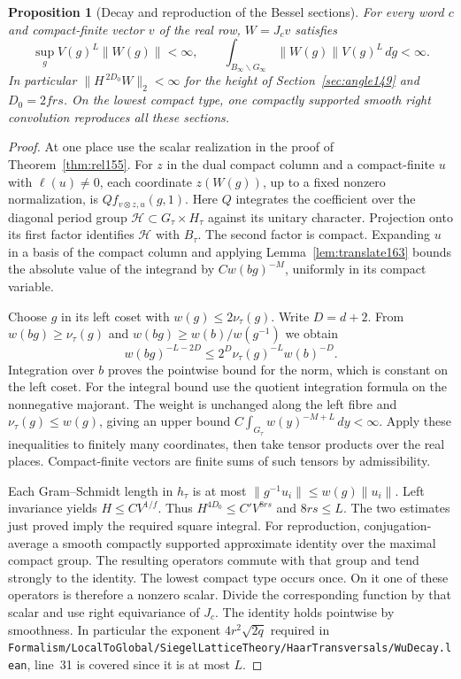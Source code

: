 \documentclass[a4paper,11pt]{article}
\newtheorem{proposition}{Proposition}[section]
\theoremstyle{definition}
\theoremstyle{remark}
\newcommand{\srcloc}[2]{{\small\nolinkurl{#1.lean}}, line~#2}
\numberwithin{equation}{section}
\begin{document}
\begin{proposition}[Decay and reproduction of the Bessel sections]
\label{prop:weight163}
For every word \(c\) and compact-finite vector \(v\) of the
real row, \(W=J_cv\) satisfies
\[
  \sup_g V(g)^L\|W(g)\|<\infty,\qquad
  \int_{B_\infty\backslash G_\infty}\|W(g)\|V(g)^L\,d\dot g<\infty .
\]
In particular \(\|H^{\,2D_0}W\|_2<\infty\) for the height of
Section~\ref{sec:angle149} and \(D_0=2frs\). On the lowest
compact type, one compactly supported smooth right convolution
reproduces all these sections.
\end{proposition}
\begin{proof}
At one place use the scalar realization in the proof of
Theorem~\ref{thm:rel155}. For \(z\) in the dual compact column
and a compact-finite \(u\) with \(\ell(u)\ne0\), each coordinate
\(z(W(g))\), up to a fixed nonzero normalization, is
\(Qf_{v\otimes z,u}(g,1)\). Here \(Q\) integrates the coefficient
over the diagonal period group \(\mathcal H\subset
G_\tau\times H_\tau\) against its unitary character.
Projection onto its first factor identifies \(\mathcal H\)
with \(B_\tau\). The second factor is compact. Expanding \(u\)
in a basis of the compact column and applying
Lemma~\ref{lem:translate163} bounds the absolute value of the
integrand by \(Cw(bg)^{-M}\), uniformly in its compact variable.

Choose \(g\) in its left coset with \(w(g)\le2\nu_\tau(g)\).
Write \(D=d+2\). From \(w(bg)\ge\nu_\tau(g)\) and
\(w(bg)\ge w(b)/w(g^{-1})\) we obtain
\[
 w(bg)^{-L-2D}\le 2^D\nu_\tau(g)^{-L}w(b)^{-D}.
\]
Integration over \(b\) proves the pointwise bound for the
norm, which is constant on the left coset. For the integral
bound use the quotient integration formula on the nonnegative
majorant. The weight is unchanged along the left fibre and
\(\nu_\tau(g)\le w(g)\), giving an upper bound
\(C\int_{G_\tau}w(y)^{-M+L}\,dy<\infty\).
Apply these inequalities to finitely many coordinates, then
take tensor products over the real places. Compact-finite
vectors are finite sums of such tensors by admissibility.

Each Gram--Schmidt length in \(h_\tau\) is at most
\(\|g^{-1}u_i\|\le w(g)\|u_i\|\). Left invariance yields
\(H\le C V^{1/f}\). Thus \(H^{4D_0}\le C'V^{8rs}\) and
\(8rs\le L\). The two estimates just proved imply the required
square integral. For reproduction, conjugation-average a smooth
compactly supported approximate identity over the maximal
compact group. The resulting operators commute with that
group and tend strongly to the identity. The lowest compact
type occurs once. On it one of these operators is therefore a
nonzero scalar. Divide the corresponding function by that
scalar and use right equivariance of \(J_c\). The identity
holds pointwise by smoothness. In particular the exponent
\(4r^2\sqrt{2q}\) required in
\srcloc{Formalism/LocalToGlobal/SiegelLatticeTheory/HaarTransversals/WuDecay}{31}
is covered since it is at most \(L\).
\end{proof}
\end{document}
